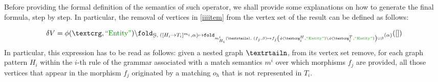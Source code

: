 Before providing the formal definition of the semantics of such operator, we shall provide some explanations on how to generate the final formula, step by step. In particular, the removal of vertices  in \ref{iiiitem} from the vertex set of the result can be defined as follows:

\begin{equation}\label{eq:deltav}
\delta V=\phi(\ngraph,\ONTA)\backslash\texttt{fold}_{\mathcal{G},\;([H_i\to T_i]^{m_i},\alpha)\mapsto \texttt{fold}_{m^i_{H_i}(\nested),\;(f_j,\beta)\mapsto f_j\left(\phi(\ngraph_i^H,\ONTA)\backslash\phi(\ngraph_i^T,\ONTA)\right)\cup\beta }(\alpha)}([])
\end{equation}
In particular, this expression has to be read as follows: given a nested graph $\nested$, from its vertex set remove, for each graph pattern $H_i$ within the $i$-th rule of the grammar associated with a match semantics $m^i$ over which morphisms $f_j$ are provided, all those vertices that appear in the morphism $f_j$ originated by a matching $o_h$ that is not represented in $T_i$.

